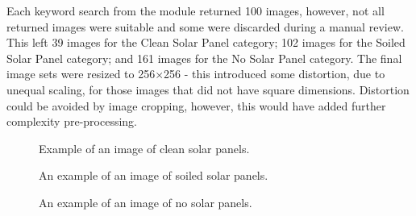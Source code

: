 \documentclass[10pt,journal,compsoc]{IEEEtran}
\begin{document}
		Each keyword search from the module returned 100 images, however, not all returned images were suitable and some were discarded during a manual review. This left 39 images for the Clean Solar Panel category; 102 images for the Soiled Solar Panel category; and  161 images for the No Solar Panel category. The final image sets were resized to 256$\times$256 - this introduced some distortion, due to unequal scaling, for those images that did not have square dimensions. Distortion could be avoided by image cropping, however, this would have added further complexity pre-processing.
		\begin{figure}[h]
			\centering
			\caption{Example of an image of clean solar panels.}
		\end{figure}
		
		\begin{figure}[h]
			\centering
			\caption{An example of an image of soiled solar panels.}
		\end{figure}
		
		\begin{figure}[h]
			\centering
			\caption{An example of an image of no solar panels.}
		\end{figure}
		
\end{document}
